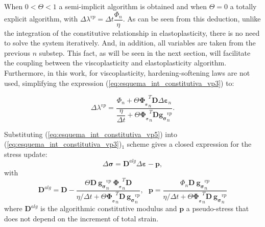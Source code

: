 \documentclass[Journal,letterpaper]{ascelike-new}
\newcommand{\dgds}{\boldsymbol{g_\sigma}}
\newcommand{\dPhidsl}{\boldsymbol{\Phi_{_\sigma}}}
\newcommand{\Dsdee}{\boldsymbol{D}}
\newcommand{\strain}{\boldsymbol{\varepsilon}}
\newcommand{\stress}{\boldsymbol{\sigma}}
\begin{document}
When $0 < \Theta < 1$ a semi-implicit algorithm is obtained and when $\Theta = 0$ a totally explicit algorithm, with $\Delta \lambda^{vp} = \Delta t \dfrac{\Phi_n}{\eta}$. As can be seen from this deduction, unlike the integration of the constitutive relationship in elastoplasticity, there is no need to solve the system iteratively. And, in addition, all variables are taken from the previous $n$ substep. This fact, as will be seen in the next section, will facilitate the coupling between the viscoplasticity and elastoplasticity algorithm. Furthermore, in this work, for viscoplasticity, hardening-softening laws are not used, simplifying the expression (\ref{eq:esquema_int_constitutiva_vp3}) to:

\begin{equation}
	\label{eq:esquema_int_constitutiva_vp5}
	\Delta \lambda^{vp} = \dfrac{\Phi_n + \Theta \dPhidsl_n^T\Dsdee\Delta\strain_n}{\dfrac{\eta}{\Delta t} + \Theta \dPhidsl_n^T\Dsdee\dgds_n^{vp}}.
\end{equation}

Substituting (\ref{eq:esquema_int_constitutiva_vp5}) into (\ref{eq:esquema_int_constitutiva_vp3})$_1$ scheme gives a closed expression for the stress update:
\begin{equation}
	\label{eq:esquema_int_constitutiva_vp6}
	\Delta \stress = \Dsdee^{alg} \Delta \strain - \boldsymbol p,
\end{equation}
with
\begin{equation}
	\label{eq:esquema_int_constitutiva_vp6}
	\Dsdee^{alg} = \Dsdee - \dfrac{\Theta \Dsdee~\dgds_n^{vp}~\dPhidsl_n^T \Dsdee}{\eta/\Delta t+ \Theta \dPhidsl_n^T\Dsdee~\dgds_n^{vp}},~~~\boldsymbol p = \dfrac{\Phi_n \Dsdee ~\dgds_n^{vp}}{\eta/\Delta t+ \Theta \dPhidsl_n^T\Dsdee~\dgds_n^{vp}}
\end{equation}
where $\Dsdee^{alg}$ is the algorithmic constitutive modulus and $\boldsymbol p$ a pseudo-stress that does not depend on the increment of total strain.
\end{document}
